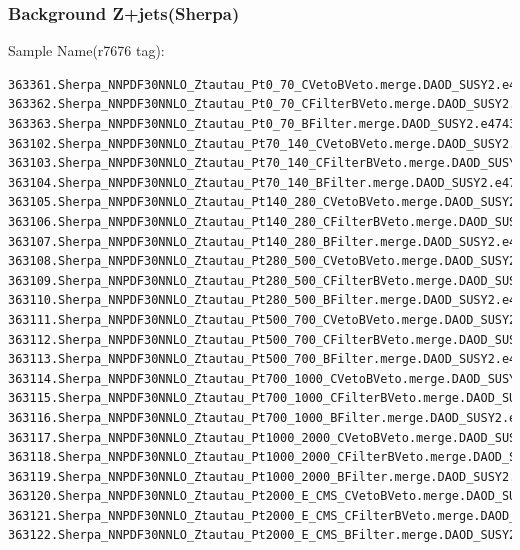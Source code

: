 \documentclass[mathserif,serif]{beamer}
\begin{document}
\begin{frame}[fragile]
\frametitle{Background Z+jets(Sherpa)}
\small
Sample Name(r7676 tag):
\tiny
\begin{verbatim}
363361.Sherpa_NNPDF30NNLO_Ztautau_Pt0_70_CVetoBVeto.merge.DAOD_SUSY2.e4689_s2726_r7725_r7676_p2666/
363362.Sherpa_NNPDF30NNLO_Ztautau_Pt0_70_CFilterBVeto.merge.DAOD_SUSY2.e4689_s2726_r7725_r7676_p2666/
363363.Sherpa_NNPDF30NNLO_Ztautau_Pt0_70_BFilter.merge.DAOD_SUSY2.e4743_s2726_r7725_r7676_p2666/
363102.Sherpa_NNPDF30NNLO_Ztautau_Pt70_140_CVetoBVeto.merge.DAOD_SUSY2.e4742_s2726_r7725_r7676_p2666/
363103.Sherpa_NNPDF30NNLO_Ztautau_Pt70_140_CFilterBVeto.merge.DAOD_SUSY2.e4742_s2726_r7725_r7676_p2666/
363104.Sherpa_NNPDF30NNLO_Ztautau_Pt70_140_BFilter.merge.DAOD_SUSY2.e4792_s2726_r7725_r7676_p2666/
363105.Sherpa_NNPDF30NNLO_Ztautau_Pt140_280_CVetoBVeto.merge.DAOD_SUSY2.e4666_s2726_r7725_r7676_p2666/
363106.Sherpa_NNPDF30NNLO_Ztautau_Pt140_280_CFilterBVeto.merge.DAOD_SUSY2.e4666_s2726_r7725_r7676_p2666/
363107.Sherpa_NNPDF30NNLO_Ztautau_Pt140_280_BFilter.merge.DAOD_SUSY2.e4742_s2726_r7725_r7676_p2666/
363108.Sherpa_NNPDF30NNLO_Ztautau_Pt280_500_CVetoBVeto.merge.DAOD_SUSY2.e4666_s2726_r7725_r7676_p2666/
363109.Sherpa_NNPDF30NNLO_Ztautau_Pt280_500_CFilterBVeto.merge.DAOD_SUSY2.e4792_s2726_r7725_r7676_p2666/
363110.Sherpa_NNPDF30NNLO_Ztautau_Pt280_500_BFilter.merge.DAOD_SUSY2.e4792_s2726_r7725_r7676_p2666/
363111.Sherpa_NNPDF30NNLO_Ztautau_Pt500_700_CVetoBVeto.merge.DAOD_SUSY2.e4666_s2726_r7725_r7676_p2666/
363112.Sherpa_NNPDF30NNLO_Ztautau_Pt500_700_CFilterBVeto.merge.DAOD_SUSY2.e4742_s2726_r7725_r7676_p2666/
363113.Sherpa_NNPDF30NNLO_Ztautau_Pt500_700_BFilter.merge.DAOD_SUSY2.e4742_s2726_r7725_r7676_p2666/
363114.Sherpa_NNPDF30NNLO_Ztautau_Pt700_1000_CVetoBVeto.merge.DAOD_SUSY2.e4742_s2726_r7725_r7676_p2666/
363115.Sherpa_NNPDF30NNLO_Ztautau_Pt700_1000_CFilterBVeto.merge.DAOD_SUSY2.e4792_s2726_r7725_r7676_p2666/
363116.Sherpa_NNPDF30NNLO_Ztautau_Pt700_1000_BFilter.merge.DAOD_SUSY2.e4742_s2726_r7725_r7676_p2666/
363117.Sherpa_NNPDF30NNLO_Ztautau_Pt1000_2000_CVetoBVeto.merge.DAOD_SUSY2.e4666_s2726_r7725_r7676_p2666/
363118.Sherpa_NNPDF30NNLO_Ztautau_Pt1000_2000_CFilterBVeto.merge.DAOD_SUSY2.e4666_s2726_r7725_r7676_p2666/
363119.Sherpa_NNPDF30NNLO_Ztautau_Pt1000_2000_BFilter.merge.DAOD_SUSY2.e4666_s2726_r7725_r7676_p2666/
363120.Sherpa_NNPDF30NNLO_Ztautau_Pt2000_E_CMS_CVetoBVeto.merge.DAOD_SUSY2.e4690_s2726_r7725_r7676_p2666/
363121.Sherpa_NNPDF30NNLO_Ztautau_Pt2000_E_CMS_CFilterBVeto.merge.DAOD_SUSY2.e4690_s2726_r7725_r7676_p2666/
363122.Sherpa_NNPDF30NNLO_Ztautau_Pt2000_E_CMS_BFilter.merge.DAOD_SUSY2.e4792_s2726_r7725_r7676_p2666/
\end{verbatim}
\end{frame}
\end{document}
